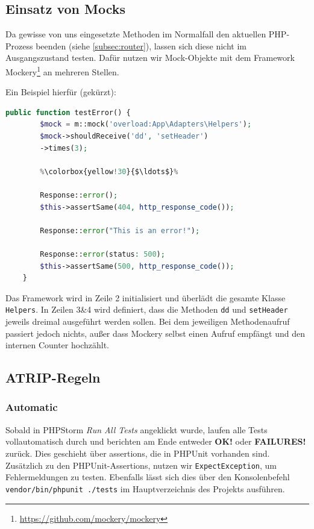 \documentclass[12pt,a4paper,titlepage,ngerman,pdftex]{report}
\begin{document}
    \subsection{Einsatz von Mocks}
    Da gewisse von uns eingesetzte Methoden im Normalfall den aktuellen PHP-Prozess beenden (siehe \ref{subsec:router}), lassen sich diese nicht im Ausgangszustand testen.
    Dafür nutzen wir Mock-Objekte mit dem Framework Mockery\footnote{\url{https://github.com/mockery/mockery}} an mehreren Stellen.

    Ein Beispiel hierfür (gekürzt):
    \begin{lstlisting}[language=php,label={lst:mockery},escapechar=\%,caption={Einsatz von Mockery}]
    public function testError() {
        $mock = m::mock('overload:App\Adapters\Helpers');
        $mock->shouldReceive('dd', 'setHeader')
        ->times(3);

        %\colorbox{yellow!30}{$\ldots$}%

        Response::error();
        $this->assertSame(404, http_response_code());

        Response::error("This is an error!");

        Response::error(status: 500);
        $this->assertSame(500, http_response_code());
    }\end{lstlisting}

    Das Framework wird in Zeile 2 initialisiert und überlädt die gesamte Klasse \verb|Helpers|.
    In Zeilen 3\&4 wird definiert, dass die Methoden \verb|dd| und \verb|setHeader| jeweils dreimal ausgeführt werden sollen.
    Bei dem jeweiligen Methodenaufruf passiert jedoch nichts, außer dass Mockery selbst einen Aufruf empfängt und den internen Counter hochzählt.

    \subsection{ATRIP-Regeln}
    \label{subsec:atrip-regeln}

    \subsubsection{Automatic}
    Sobald in PHPStorm \textit{Run All Tests} angeklickt wurde, laufen alle Tests vollautomatisch durch und berichten am Ende entweder \textbf{OK!} oder \textbf{FAILURES!} zurück.
    Dies geschieht über assertions, die in PHPUnit vorhanden sind.
    Zusätzlich zu den PHPUnit-Assertions, nutzen wir \verb|ExpectException|, um Fehlermeldungen zu testen.
    Ebenfalls lässt sich dies über den Konsolenbefehl \verb| vendor/bin/phpunit ./tests| im Hauptverzeichnis des Projekts ausführen.
\end{document}

